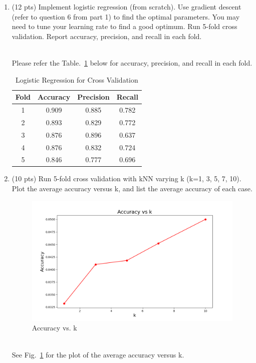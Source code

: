 \documentclass[a4paper]{article}
\theoremstyle{definition}
\newenvironment{soln}{
    \leavevmode\color{blue}\ignorespaces
}{}
\begin{document}
\begin{enumerate}
	\item (12 pts) Implement logistic regression (from scratch). Use gradient descent (refer to question 6 from part 1) to find the optimal parameters. You may need to tune your learning rate to find a good optimum. Run 5-fold cross validation. Report accuracy, precision, and recall in each fold.
	
	\begin{soln}\\
	Please refer the Table.~\ref{tab:lr} below for accuracy, precision, and recall in each fold.
	\begin{table}
		\centering
		\begin{tabular}{|c|c|c|c|}
			\hline
			Fold & Accuracy & Precision & Recall\\
			\hline
			1 & 0.909 & 0.885 & 0.782\\
			2 & 0.893 & 0.829 & 0.772\\
			3 & 0.876 & 0.896 & 0.637\\
			4 & 0.876 & 0.832 & 0.724\\
			5 & 0.846 & 0.777 & 0.696\\
			\hline
		\end{tabular}
		\caption{Logistic Regression for Cross Validation}
		\label{tab:lr}
	\end{table}
	\end{soln}
	
	\item (10 pts) Run 5-fold cross validation with kNN varying k (k=1, 3, 5, 7, 10). Plot the average accuracy versus k, and list the average accuracy of each case. \\
	\begin{figure}
		\centering
		\includegraphics[width=0.5\linewidth]{images/accuracyK.png}
		\caption{Accuracy vs. k} 
		\label{fig:knn}
	\end{figure}
	\begin{soln}\\
	See Fig.~\ref{fig:knn} for the plot of the average accuracy versus k.\\
	\end{soln}
	

\end{enumerate}
\end{document}
